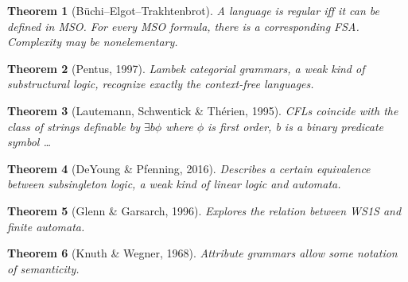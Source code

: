 \documentclass[11pt]{article}
\theoremstyle{plain}
\newtheorem{theorem}{Theorem}
\theoremstyle{definition}
\begin{document}
\begin{theorem}[B\"uchi–Elgot–Trakhtenbrot]
A language is regular iff it can be defined in MSO. For every MSO formula, there is a corresponding FSA. Complexity may be nonelementary.
\end{theorem}

\begin{theorem}[Pentus, 1997]
  Lambek categorial grammars, a weak kind of substructural logic, recognize exactly the context-free languages.
\end{theorem}

\begin{theorem}[Lautemann, Schwentick \& Th\'erien, 1995]
  CFLs coincide with the class of strings definable by $\exists b \phi$ where $\phi$ is first order, b is a binary predicate symbol \ldots
\end{theorem}

\begin{theorem}[DeYoung \& Pfenning, 2016]
  Describes a certain equivalence between subsingleton logic, a weak kind of linear logic and automata.
\end{theorem}

\begin{theorem}[Glenn \& Garsarch, 1996]
  Explores the relation between WS1S and finite automata.
\end{theorem}

\begin{theorem}[Knuth \& Wegner, 1968]
  Attribute grammars allow some notation of semanticity.
\end{theorem}
\end{document}
